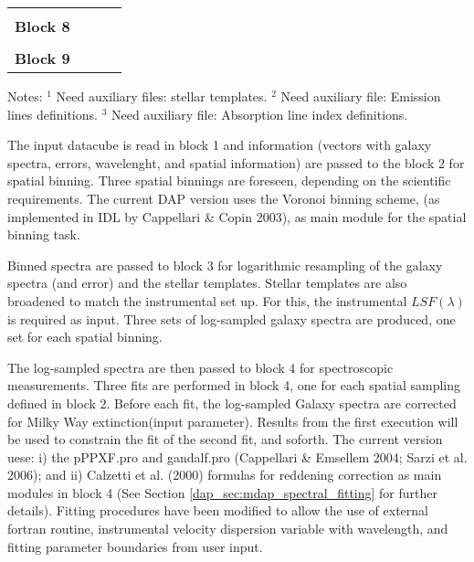 \begin{table}
\begin{scriptsize}
\begin{tabular}{l |l |l | l}
\hline
              &                                 &  &  \\  
{\bf Block 8} &                                 &                                &  \\
\hline
              &                                 &  &  \\  
{\bf Block 9} &                                 &                                &  \\
\hline
\hline
\end{tabular}
\end{scriptsize}
\begin{minipage}{15cm}
Notes: 
$^{1}$ Need auxiliary files: stellar templates. 
$^{2}$ Need auxiliary file: Emission lines definitions. 
$^{3}$ Need auxiliary file: Absorption line index definitions.
\end{minipage}
\label{dap_tab:modules}
\end{table}

The input datacube is read in block 1 and information (vectors with
galaxy spectra, errors, wavelenght, and spatial information) are
passed to the block 2 for spatial binning. Three spatial binnings are
foreseen, depending on the scientific requirements. The current DAP
version uses the Voronoi binning scheme, (as implemented in IDL by
Cappellari \& Copin 2003), as main module for the spatial binning
task.

Binned spectra are passed to block 3 for logarithmic resampling of the
galaxy spectra (and error) and the stellar templates. Stellar
templates are also broadened to match the instrumental set up. For
this, the instrumental $LSF(\lambda)$ is required as input. Three sets
of log-sampled galaxy spectra are produced, one set for each spatial
binning.

The log-sampled spectra are then passed to block 4 for spectroscopic
measurements. Three fits are performed in block 4, one for each
spatial sampling defined in block 2. Before each fit, the log-sampled
Galaxy spectra are corrected for Milky Way extinction(input
parameter). Results from the first execution will be used to constrain
the fit of the second fit, and soforth. The current version uese: i)
the pPPXF.pro and gandalf.pro (Cappellari \& Emsellem 2004; Sarzi et
al. 2006); and ii) Calzetti et al. (2000) formulas for reddening
correction as main modules in block 4 (See Section
\ref{dap_sec:mdap_spectral_fitting} for further details). Fitting
procedures have been modified to allow the use of external fortran
routine, instrumental velocity dispersion variable with wavelength,
and fitting parameter boundaries from user input.


